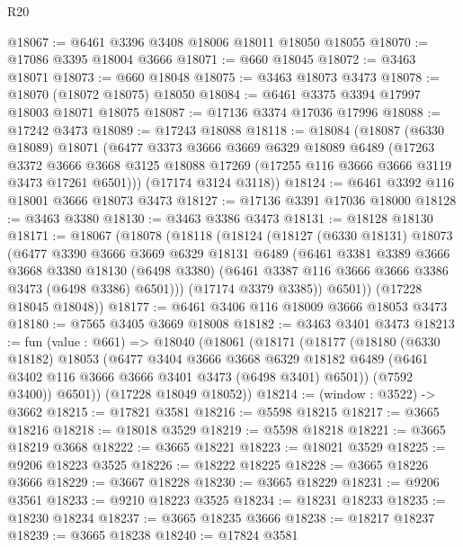 \begin{lexlean}{R20}
\begin{coremodule}
@18067 := @6461 @3396 @3408 @18006 @18011 @18050 @18055
@18070 := @17086 @3395 @18004 @3666
@18071 := @660 @18045
@18072 := @3463 @18071
@18073 := @660 @18048
@18075 := @3463 @18073 @3473
@18078 := @18070 (@18072 @18075) @18050
@18084 := @6461 @3375 @3394 @17997 @18003 @18071 @18075
@18087 := @17136 @3374 @17036 @17996
@18088 := @17242 @3473
@18089 := @17243 @18088
@18118 := @18084
    (@18087
      (@6330 @18089)
      @18071
      (@6477
        @3373
        @3666
        @3669
        @6329
        @18089
        @6489
        (@17263
          @3372
          @3666
          @3668
          @3125
          @18088
          @17269
          (@17255 @116 @3666 @3666 @3119 @3473 @17261 @6501)))
      (@17174 @3124 @3118))
@18124 := @6461 @3392 @116 @18001 @3666 @18073 @3473
@18127 := @17136 @3391 @17036 @18000
@18128 := @3463 @3380
@18130 := @3463 @3386 @3473
@18131 := @18128 @18130
@18171 := @18067
    (@18078
      (@18118
        (@18124
          (@18127
            (@6330 @18131)
            @18073
            (@6477
              @3390
              @3666
              @3669
              @6329
              @18131
              @6489
              (@6461
                @3381
                @3389
                @3666
                @3668
                @3380
                @18130
                (@6498 @3380)
                (@6461 @3387 @116 @3666 @3666 @3386 @3473 (@6498 @3386) @6501)))
            (@17174 @3379 @3385))
          @6501))
      (@17228 @18045 @18048))
@18177 := @6461 @3406 @116 @18009 @3666 @18053 @3473
@18180 := @7565 @3405 @3669 @18008
@18182 := @3463 @3401 @3473
@18213 := fun (value : @661) =>
  @18040
    (@18061
      (@18171
        (@18177
          (@18180
            (@6330 @18182)
            @18053
            (@6477
              @3404
              @3666
              @3668
              @6329
              @18182
              @6489
              (@6461 @3402 @116 @3666 @3666 @3401 @3473 (@6498 @3401) @6501))
            (@7592 @3400))
          @6501))
      (@17228 @18049 @18052))
@18214 := (window : @3522) -> @3662
@18215 := @17821 @3581
@18216 := @5598 @18215
@18217 := @3665 @18216
@18218 := @18018 @3529
@18219 := @5598 @18218
@18221 := @3665 @18219 @3668
@18222 := @3665 @18221
@18223 := @18021 @3529
@18225 := @9206 @18223 @3525
@18226 := @18222 @18225
@18228 := @3665 @18226 @3666
@18229 := @3667 @18228
@18230 := @3665 @18229
@18231 := @9206 @3561
@18233 := @9210 @18223 @3525
@18234 := @18231 @18233
@18235 := @18230 @18234
@18237 := @3665 @18235 @3666
@18238 := @18217 @18237
@18239 := @3665 @18238
@18240 := @17824 @3581

\end{coremodule}
\end{lexlean}
